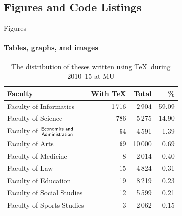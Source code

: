\documentclass{beamer}
\begin{document}
    \subsection{Figures and Code Listings}
    \begin{frame}[label=figs1]{Figures}
      \framesubtitle{Tables, graphs, and images}
      \begin{table}[!b]
        {\carlitoTLF %
        \begin{tabularx}{\textwidth}{Xrrr}
          \textbf{Faculty} & \textbf{With \TeX} & \textbf{Total} &
          \textbf{\%} \\
          \toprule
          Faculty of Informatics       & 1\,716  & 2\,904  &
          59.09 \\%
          Faculty of Science           & 786     & 5\,275  &
          14.90 \\%
          Faculty of $\genfrac{}{}{0pt}{}{\textsf{Economics and}}{%
          \textsf{Administration}}$    & 64      & 4\,591  &
          1.39  \\%
          Faculty of Arts              & 69      & 10\,000 &
          0.69  \\%
          Faculty of Medicine          & 8       & 2\,014  &
          0.40  \\%
          Faculty of Law               & 15      & 4\,824  &
          0.31  \\%
          Faculty of Education         & 19      & 8\,219  &
          0.23  \\%
          Faculty of Social Studies    & 12      & 5\,599  &
          0.21  \\%
          Faculty of Sports Studies    & 3       & 2\,062  &
          0.15  \\%
          \bottomrule
        \end{tabularx}}
        \caption{The distribution of theses written using \TeX\ during 2010--15 at MU}
      \end{table}
    \end{frame}
\end{document}
